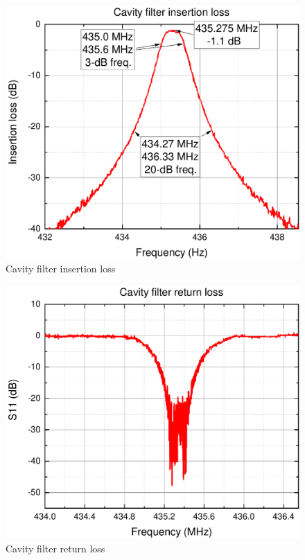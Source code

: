 \begin{figure}
    \centering
    \includegraphics[width=0.5\paperwidth]{img/7/FilterLossG.pdf}
    \caption{Cavity filter insertion loss}
    \label{cavity_filter_insertion_loss}
\end{figure}

\begin{figure}
    \centering
    \includegraphics[width=0.5\paperwidth]{img/7/FilterMatchG.pdf}
    \caption{Cavity filter return loss}
    \label{cavity_filter_return_loss}
\end{figure}




